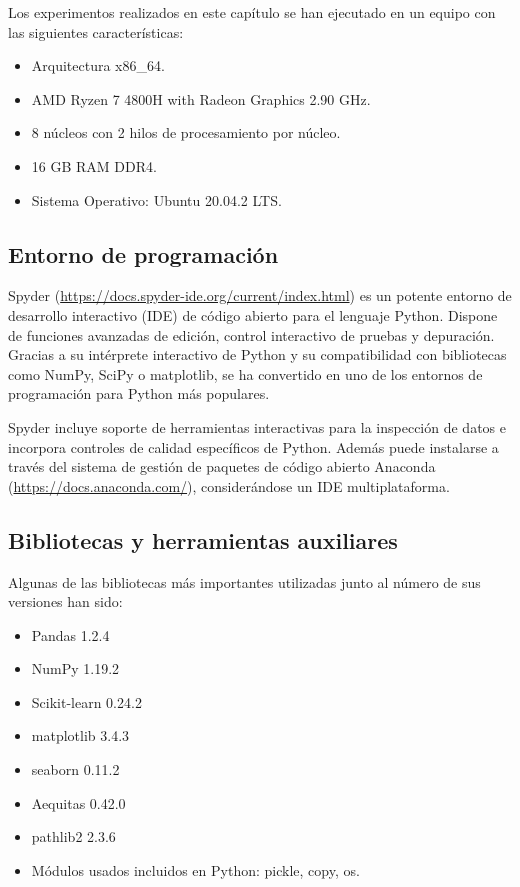 \documentclass[oneside,openright,titlepage,numbers=noenddot,openany,headinclude,footinclude=true,
cleardoublepage=empty,abstractoff,BCOR=5mm,paper=a4,fontsize=12pt,main=spanish]{scrreprt}
\begin{document}
Los experimentos realizados en este capítulo se han ejecutado en un equipo con las siguientes características:

\begin{itemize}
    \item Arquitectura x86\_64.
    \item AMD Ryzen 7 4800H with Radeon Graphics 2.90 GHz.
    \item 8 núcleos con 2 hilos de procesamiento por núcleo.
    \item 16 GB RAM DDR4.
    \item Sistema Operativo: Ubuntu 20.04.2 LTS.
\end{itemize}

\subsection{Entorno de programación}

Spyder (\url{https://docs.spyder-ide.org/current/index.html}) es un potente entorno de desarrollo interactivo (IDE) de código abierto para el lenguaje Python. Dispone de funciones avanzadas de edición, control interactivo de pruebas y depuración. Gracias a su intérprete interactivo de Python y su compatibilidad con bibliotecas como NumPy, SciPy o matplotlib, se ha convertido en uno de los entornos de programación para Python más populares. 

Spyder incluye soporte de herramientas interactivas para la inspección de datos e incorpora controles de calidad específicos de Python. Además puede instalarse a través del sistema de gestión de paquetes de código abierto Anaconda (\url{https://docs.anaconda.com/}), considerándose un IDE multiplataforma.

\subsection{Bibliotecas y herramientas auxiliares}

Algunas de las bibliotecas más importantes utilizadas junto al número de sus versiones han sido:

\begin{itemize}
    \item Pandas 1.2.4
    \item NumPy 1.19.2
    \item Scikit-learn 0.24.2
    \item matplotlib 3.4.3
    \item seaborn 0.11.2
    \item Aequitas 0.42.0
    \item pathlib2 2.3.6
    \item Módulos usados incluidos en Python: pickle, copy, os.
\end{itemize}
\end{document}
